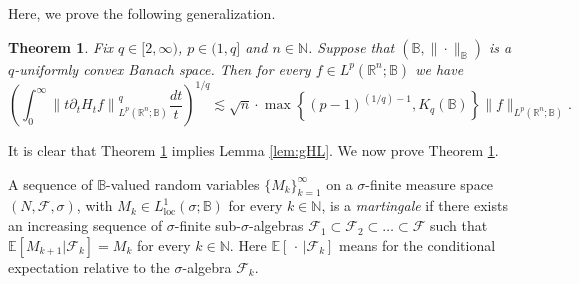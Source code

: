 \documentclass[11pt,reqno]{amsart}
\newtheorem{theorem}{Theorem}
\newcommand{\1}{\mathbf 1}
\newcommand{\R}{\mathbb{R}}
\newcommand{\Norm}[2]{\|#1\|_{#2}}
\begin{document}
Here, we prove the following generalization.
\begin{theorem}\label{thm:LPtime2} Fix $q\in [2,\infty)$, $p\in (1,q]$ and $n\in \mathbb{N}$. Suppose that $(\mathbb{B},\|\cdot\|_\mathbb{B})$ is a $q$-uniformly convex Banach space. Then for every $f\in L^p(\mathbb{R}^n;\mathbb{B})$ we have
	\begin{equation}\label{eq:temporal heat intro}
		\left(\int_0^\infty\left\|t\partial_t H_t f\right\|_{L^p\left(\R^n;\mathbb{B}\right)}^q\frac{d t}{t}\right)^{1/q}
		\lesssim\sqrt{n}\cdot\max\left\{\left(p-1\right)^{(1/q)-1},K_q\left(\mathbb{B}\right)\right\}\Norm{f}{L^p(\R^n;\mathbb{B})}.
	\end{equation}
\end{theorem}
It is clear that Theorem \ref{thm:LPtime2} implies Lemma \ref{lem:gHL}. We now prove Theorem \ref{thm:LPtime2}.


A sequence of $\mathbb{B}$-valued random variables $\{M_k\}_{k=1}^\infty$ on a $\sigma$-finite measure space $(N,\mathscr{F},\sigma)$, with $M_k\in L^1_{\mathrm{loc}}(\sigma;\mathbb{B})$ for every $k\in \mathbb{N}$, is a \emph{martingale} if there exists an increasing sequence of $\sigma$-finite sub-$\sigma$-algebras $\mathscr{F}_1\subset \mathscr{F}_2\subset\ldots\subset \mathscr{F}$ such that $\mathbb{E}[M_{k+1}|\mathscr{F}_k]=M_k$ for every $k\in \mathbb{N}$. Here $\mathbb{E}[\,\cdot\, |\mathscr{F}_k]$ means for the conditional expectation relative to the $\sigma$-algebra $\mathscr{F}_k$.
\end{document}

